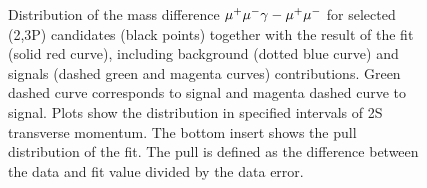 \begin{figure}[H]
\begin{picture}
  \end{picture}
  \caption {\small
    Distribution of the mass difference $\mumu \gamma - \mumu$ for selected
    \chib(2,3P) candidates (black points) together with the result of the fit
    (solid red curve), including background (dotted blue curve) and signals
    (dashed green and magenta curves) contributions. Green dashed curve corresponds
    to \chibone signal and magenta dashed curve to \chibtwo signal. Plots
    show the distribution in specified intervals of \Y2S transverse momentum.
    The bottom insert shows the  pull distribution of the fit. The pull is
    defined as the difference  between the data and fit value divided by the
    data error.
   }
  \label{fig:chib-2s:fits}
\end{figure}
